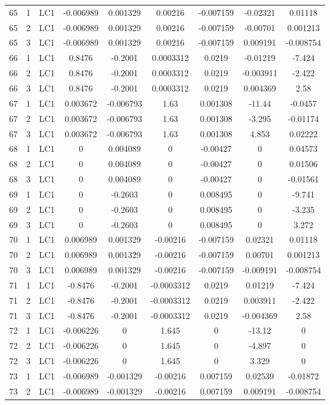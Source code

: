 \documentclass{article}%
\begin{document}
\begin{longtable}{| c c c | c c c c c c |}
65&1&LC1&{-}0.006989&0.001329&0.00216&{-}0.007159&{-}0.02321&0.01118\\%
65&2&LC1&{-}0.006989&0.001329&0.00216&{-}0.007159&{-}0.00701&0.001213\\%
65&3&LC1&{-}0.006989&0.001329&0.00216&{-}0.007159&0.009191&{-}0.008754\\%
66&1&LC1&0.8476&{-}0.2001&0.0003312&0.0219&{-}0.01219&{-}7.424\\%
66&2&LC1&0.8476&{-}0.2001&0.0003312&0.0219&{-}0.003911&{-}2.422\\%
66&3&LC1&0.8476&{-}0.2001&0.0003312&0.0219&0.004369&2.58\\%
67&1&LC1&0.003672&{-}0.006793&1.63&0.001308&{-}11.44&{-}0.0457\\%
67&2&LC1&0.003672&{-}0.006793&1.63&0.001308&{-}3.295&{-}0.01174\\%
67&3&LC1&0.003672&{-}0.006793&1.63&0.001308&4.853&0.02222\\%
68&1&LC1&0&0.004089&0&{-}0.00427&0&0.04573\\%
68&2&LC1&0&0.004089&0&{-}0.00427&0&0.01506\\%
68&3&LC1&0&0.004089&0&{-}0.00427&0&{-}0.01561\\%
69&1&LC1&0&{-}0.2603&0&0.008495&0&{-}9.741\\%
69&2&LC1&0&{-}0.2603&0&0.008495&0&{-}3.235\\%
69&3&LC1&0&{-}0.2603&0&0.008495&0&3.272\\%
70&1&LC1&0.006989&0.001329&{-}0.00216&{-}0.007159&0.02321&0.01118\\%
70&2&LC1&0.006989&0.001329&{-}0.00216&{-}0.007159&0.00701&0.001213\\%
70&3&LC1&0.006989&0.001329&{-}0.00216&{-}0.007159&{-}0.009191&{-}0.008754\\%
71&1&LC1&{-}0.8476&{-}0.2001&{-}0.0003312&0.0219&0.01219&{-}7.424\\%
71&2&LC1&{-}0.8476&{-}0.2001&{-}0.0003312&0.0219&0.003911&{-}2.422\\%
71&3&LC1&{-}0.8476&{-}0.2001&{-}0.0003312&0.0219&{-}0.004369&2.58\\%
72&1&LC1&{-}0.006226&0&1.645&0&{-}13.12&0\\%
72&2&LC1&{-}0.006226&0&1.645&0&{-}4.897&0\\%
72&3&LC1&{-}0.006226&0&1.645&0&3.329&0\\%
73&1&LC1&{-}0.006989&{-}0.001329&{-}0.00216&0.007159&0.02539&{-}0.01872\\%
73&2&LC1&{-}0.006989&{-}0.001329&{-}0.00216&0.007159&0.009191&{-}0.008754\\%

\end{longtable}
\end{document}
